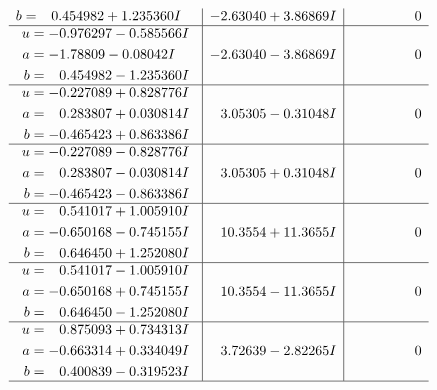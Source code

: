 \documentclass[1p]{elsarticle_modified}
\theoremstyle{definition}
\begin{document}
$$\begin{array}{c|c|c}
\begin{aligned}
b &= \phantom{-}0.454982 + 1.235360 I\end{aligned}
 & -2.63040 + 3.86869 I & \phantom{-0.000000 } 0 \\ \hline\begin{aligned}
u &= -0.976297 - 0.585566 I \\
a &= -1.78809 - 0.08042 I \\
b &= \phantom{-}0.454982 - 1.235360 I\end{aligned}
 & -2.63040 - 3.86869 I & \phantom{-0.000000 } 0 \\ \hline\begin{aligned}
u &= -0.227089 + 0.828776 I \\
a &= \phantom{-}0.283807 + 0.030814 I \\
b &= -0.465423 + 0.863386 I\end{aligned}
 & \phantom{-}3.05305 - 0.31048 I & \phantom{-0.000000 } 0 \\ \hline\begin{aligned}
u &= -0.227089 - 0.828776 I \\
a &= \phantom{-}0.283807 - 0.030814 I \\
b &= -0.465423 - 0.863386 I\end{aligned}
 & \phantom{-}3.05305 + 0.31048 I & \phantom{-0.000000 } 0 \\ \hline\begin{aligned}
u &= \phantom{-}0.541017 + 1.005910 I \\
a &= -0.650168 - 0.745155 I \\
b &= \phantom{-}0.646450 + 1.252080 I\end{aligned}
 & \phantom{-}10.3554 + 11.3655 I & \phantom{-0.000000 } 0 \\ \hline\begin{aligned}
u &= \phantom{-}0.541017 - 1.005910 I \\
a &= -0.650168 + 0.745155 I \\
b &= \phantom{-}0.646450 - 1.252080 I\end{aligned}
 & \phantom{-}10.3554 - 11.3655 I & \phantom{-0.000000 } 0 \\ \hline\begin{aligned}
u &= \phantom{-}0.875093 + 0.734313 I \\
a &= -0.663314 + 0.334049 I \\
b &= \phantom{-}0.400839 - 0.319523 I\end{aligned}
 & \phantom{-}3.72639 - 2.82265 I & \phantom{-0.000000 } 0\\
 \hline 
 \end{array}$$\newpage$$\begin{array}{c|c|c}  

\end{array}$$
\end{document}
